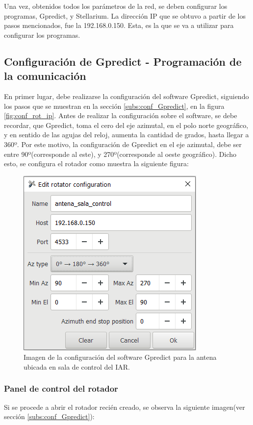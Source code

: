 Una vez, obtenidos todos los parámetros de la red, se deben configurar los programas, Gpredict, y Stellarium. La dirección IP que se obtuvo a partir de los pasos mencionados, fue la 192.168.0.150. Esta, es la que se va a utilizar para configurar los programas. 

\subsection{Configuración de Gpredict - Programación de la comunicación} 

En primer lugar, debe realizarse la configuración del software Gpredict, siguiendo los pasos que se muestran en la sección \ref{subs:conf_Gpredict}, en la figura \ref{fig:conf_rot_ip}. Antes de realizar la configuración sobre el software, se debe recordar, que Gpredict, toma el cero del eje azimutal, en el polo norte geográfico, y en sentido de las agujas del reloj, aumenta la cantidad de grados, hasta llegar a 360º. Por este motivo, la configuración de Gpredict en el eje azimutal, debe ser entre 90º(corresponde al este), y 270º(corresponde al
oeste geográfico). Dicho esto, se configura el rotador como muestra la siguiente figura: 
 
\begin{figure}[H]
	\centering 
	\includegraphics{conf_rotador_gpr}
	\caption{Imagen de la configuración del software Gpredict para la antena ubicada en sala de control del IAR. }
	\label{fig:conf_rot_sala_control}
\end{figure}
%
\subsubsection{Panel de control del rotador}
Si se procede a abrir el rotador recién creado, se observa la siguiente imagen(ver sección \ref{subs:conf_Gpredict}): 

